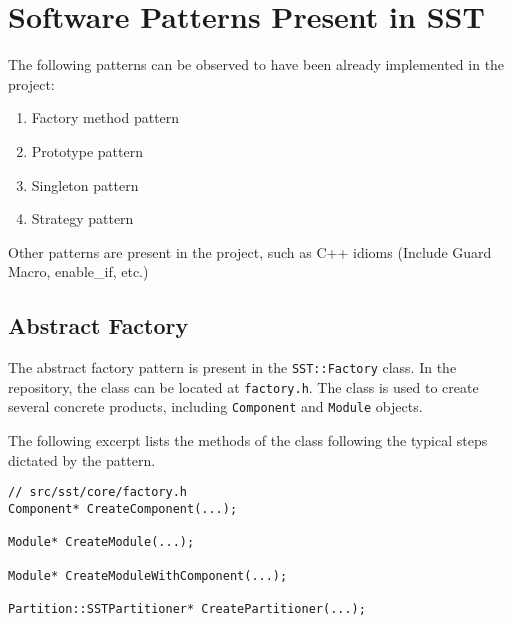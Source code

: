 
\section{Software Patterns Present in SST}
The following patterns can be observed to have been already implemented in the project:
\begin{enumerate}
    \item Factory method pattern
    \item Prototype pattern
    \item Singleton pattern
    \item Strategy pattern
\end{enumerate}
Other patterns are present in the project, such as C++ idioms (Include Guard Macro, enable\_if, etc.)


\subsection{Abstract Factory}
The abstract factory pattern is present in the \texttt{SST::Factory} class. In the repository, the class can be located at \texttt{factory.h}. The class is used to create several concrete products, including \texttt{Component} and \texttt{Module} objects.

The following excerpt lists the methods of the class following the typical steps dictated by the pattern.

\begin{lstlisting}[style=customC++,label=fm,caption=Factory Implementing the Abstract Factory Pattern]
// src/sst/core/factory.h
Component* CreateComponent(...);

Module* CreateModule(...);

Module* CreateModuleWithComponent(...);

Partition::SSTPartitioner* CreatePartitioner(...);
\end{lstlisting}

